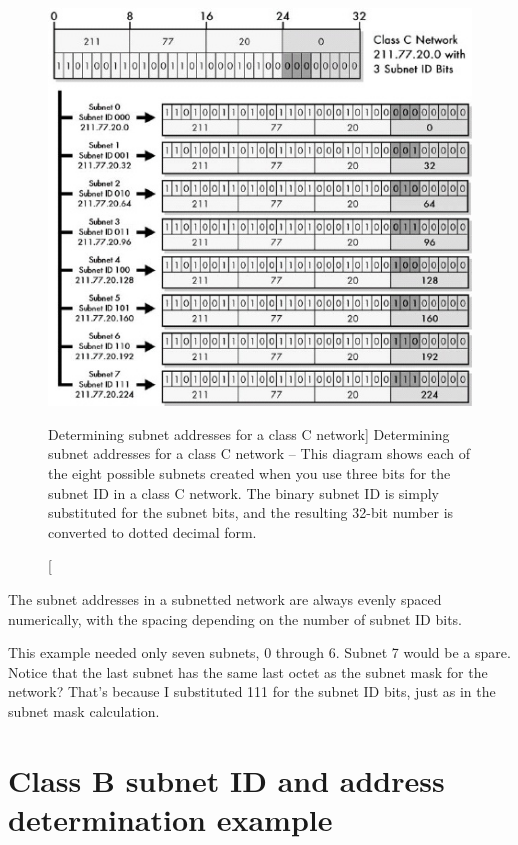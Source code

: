 \begin{figure}
   \centering
   \includegraphics[width=\textwidth]{images/class-c-subnet-addresses.jpg}
   \caption
      [Determining subnet addresses for a class C network]
      {Determining subnet addresses for a class C network --
      This diagram shows each of the eight possible subnets created when you use three bits for the subnet ID in a class C network.
      The binary subnet ID is simply substituted for the subnet bits, and the resulting 32-bit number is converted to dotted decimal form.}
   \label{fig:class-c-subnet-addresses}
\end{figure}


\begin{keyconcept}
The subnet addresses in a subnetted network are always evenly spaced numerically, with the spacing depending on the number of subnet ID bits.
\end{keyconcept}

This example needed only seven subnets, 0 through 6.
Subnet 7 would be a spare.
Notice that the last subnet has the same last octet as the subnet mask for the network?
That's because I substituted 111 for the subnet ID bits, just as in the subnet mask calculation.



\section{Class B subnet ID and address determination example}

